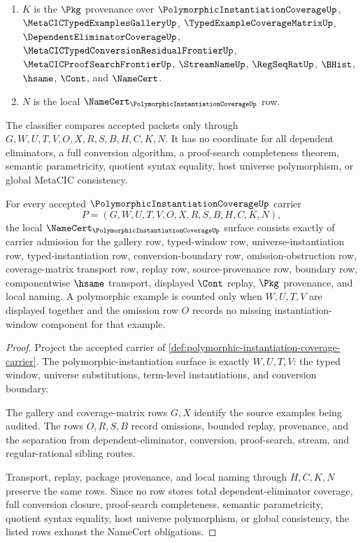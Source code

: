 \begin{definition}
\begin{enumerate}
$$$$
\item $K$ is the $\Pkg$ provenance over $\PolymorphicInstantiationCoverageUp$, $\MetaCICTypedExamplesGalleryUp$, $\TypedExampleCoverageMatrixUp$, $\DependentEliminatorCoverageUp$, $\MetaCICTypedConversionResidualFrontierUp$, $\MetaCICProofSearchFrontierUp$, $\StreamNameUp$, $\RegSeqRatUp$, $\BHist$, $\hsame$, $\Cont$, and $\NameCert$.
\item $N$ is the local $\NameCert_{\PolymorphicInstantiationCoverageUp}$ row.
\end{enumerate}
The classifier compares accepted packets only through $G,W,U,T,V,O,X,R,S,B,H,C,K,N$. It has no coordinate for all dependent eliminators, a full conversion algorithm, a proof-search completeness theorem, semantic parametricity, quotient syntax equality, host universe polymorphism, or global MetaCIC consistency.
\end{definition}

\begin{theorem}
\label{thm:polymorphic-instantiation-coverage-namecert-obligations}
For every accepted $\PolymorphicInstantiationCoverageUp$ carrier
$$
P=(G,W,U,T,V,O,X,R,S,B,H,C,K,N),
$$
the local $\NameCert_{\PolymorphicInstantiationCoverageUp}$ surface consists exactly of carrier admission for the gallery row, typed-window row, universe-instantiation row, typed-instantiation row, conversion-boundary row, omission-obstruction row, coverage-matrix transport row, replay row, source-provenance row, boundary row, componentwise $\hsame$ transport, displayed $\Cont$ replay, $\Pkg$ provenance, and local naming. A polymorphic example is counted only when $W,U,T,V$ are displayed together and the omission row $O$ records no missing instantiation-window component for that example.
\end{theorem}
\begin{proof}
Project the accepted carrier of \autoref{def:polymorphic-instantiation-coverage-carrier}. The polymorphic-instantiation surface is exactly $W,U,T,V$: the typed window, universe substitutions, term-level instantiations, and conversion boundary.

The gallery and coverage-matrix rows $G,X$ identify the source examples being audited. The rows $O,R,S,B$ record omissions, bounded replay, provenance, and the separation from dependent-eliminator, conversion, proof-search, stream, and regular-rational sibling routes.

Transport, replay, package provenance, and local naming through $H,C,K,N$ preserve the same rows. Since no row stores total dependent-eliminator coverage, full conversion closure, proof-search completeness, semantic parametricity, quotient syntax equality, host universe polymorphism, or global consistency, the listed rows exhaust the NameCert obligations.
\end{proof}

